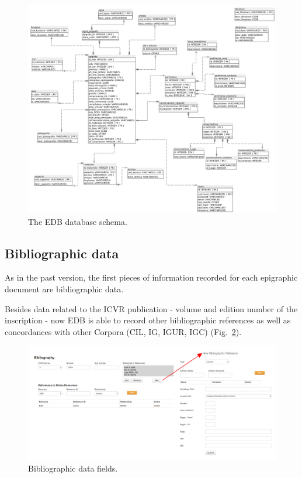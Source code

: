 \documentclass[amsthm,ebook]{saparticle}
\begin{document}
\begin{figure}[hbp]
\centering
 \includegraphics[width=\columnwidth]{EAGLE2016Roccoengrev-img004.png} 
\caption{The EDB database schema.}
\label{fig:4}
\end{figure}




\subsection{Bibliographic data}


As in the past version, the first pieces of information recorded for each epigraphic document are bibliographic data.

Besides data related to the ICVR publication - volume and edition number of the inscription - now EDB is able to record
other bibliographic references as well as concordances with other Corpora (CIL, IG, IGUR, IGC) (Fig.~\ref{fig:3b}). 

\newpage
\begin{figure}[!hbp]
\centering
 \includegraphics[width=\columnwidth]{Fig4.png}
\caption{Bibliographic data fields.}
\label{fig:3b}
\end{figure}
\end{document}
